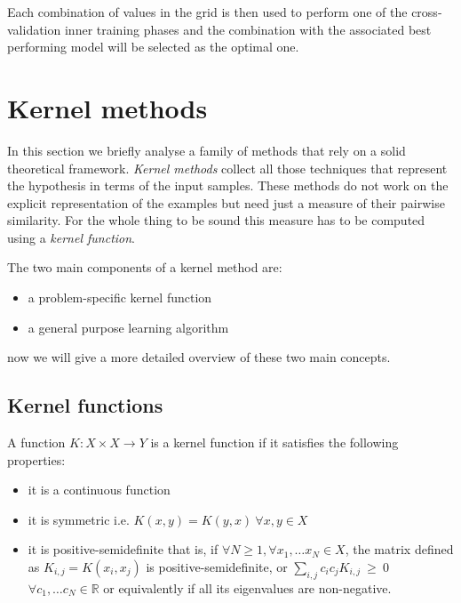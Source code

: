 Each combination of values in the grid is then used to perform one of the cross-validation
inner training phases and the combination with the associated best performing model
will be selected as the optimal one.


\section{Kernel methods}
\label{sec:kernel}

In this section we briefly analyse a family of methods that rely on a solid
theoretical framework.
\emph{Kernel methods} collect all those techniques that represent the hypothesis
in terms of the input samples.
These methods do not work on the explicit representation of the examples but
need just a measure of their pairwise similarity.
For the whole thing to be sound this measure has to be computed using a
\emph{kernel function}.

The two main components of a kernel method are:
\begin{itemize}
    \item a problem-specific kernel function
    \item a general purpose learning algorithm
\end{itemize}
now we will give a more detailed overview of these two main concepts.

\subsection{Kernel functions}
\label{subsec:kernelfunc}
A function $K:X\times X \to Y$ is a kernel function if it satisfies the following properties:
\begin{itemize}
    \item it is a continuous function
    \item it is symmetric i.e. $K(x,y) = K(y,x)~\forall x,y \in X$
    \item it is positive-semidefinite that is, if $\forall N\geq 1, \forall x_1,\dots x_N \in X$,
        the matrix defined as $K_{i,j} = K(x_i,x_j)$ is positive-semidefinite,
        or $\sum_{i,j}c_ic_jK_{i,j}~\geq~0$ $\forall c_1,\dots c_N \in \mathbb{R}$
        or equivalently if all its eigenvalues are non-negative.
\end{itemize}

